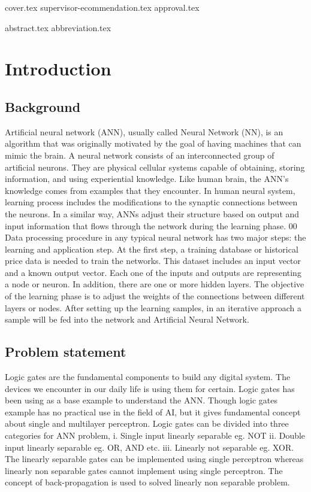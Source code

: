 \documentclass[a4paper,12pt]{report}
\begin{document}
{cover.tex}
{supervisor-ecommendation.tex}
{approval.tex}

\setcounter{page}{1}
{abstract.tex}   
{abbreviation.tex}  

       
\tableofcontents

 
\thispagestyle{empty} 
\listoffigures 
\newpage

\clearpage
\setcounter{page}{1}

\chapter{Introduction}
\section{Background}
Artificial neural network (ANN), usually called Neural Network (NN), is an
algorithm that was originally motivated by the goal of having machines that
can mimic the brain. A neural network consists of an interconnected group of
artificial neurons. They are physical cellular systems capable of obtaining,
storing information, and using experiential knowledge. Like human brain, the
ANN’s knowledge comes from examples that they encounter. In human
neural system, learning process includes the modifications to the synaptic
connections between the neurons. In a similar way, ANNs adjust their
structure based on output and input information that flows through the
network during the learning phase.
00
Data processing procedure in any typical neural network has two major steps:
the learning and application step. At the first step, a training database or
historical price data is needed to train the networks. This dataset includes an
input vector and a known output vector. Each one of the inputs and outputs
are representing a node or neuron. In addition, there are one or more hidden
layers. The objective of the learning phase is to adjust the weights of the
connections between different layers or nodes. After setting up the learning
samples, in an iterative approach a sample will be fed into the network and
Artificial Neural Network.

\section{Problem statement}
Logic gates are the fundamental components to build any digital system. The devices we encounter in our daily life is using them for certain. Logic gates has been using as a base example to understand the ANN. Though logic gates example has no practical use in the field of AI, but it gives fundamental concept about single and multilayer perceptron. Logic gates can be divided into three categories for ANN problem, i. Single input linearly separable eg. NOT ii. Double input linearly separable eg. OR, AND etc. iii. Linearly not separable eg. XOR. The linearly separable gates can be implemented using single perceptron whereas linearly non separable gates cannot  implement using single perceptron. The concept of back-propagation is used to solved linearly non separable problem. 
\end{document}
